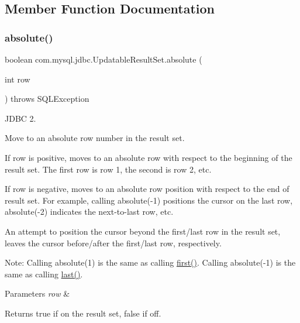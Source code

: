 \subsection{Member Function Documentation}
\mbox{\label{classcom_1_1mysql_1_1jdbc_1_1_updatable_result_set_ae6cbce4543dd7fd0006429895feb1252}} 
\subsubsection{\texorpdfstring{absolute()}{absolute()}}
{\footnotesize\ttfamily boolean com.\+mysql.\+jdbc.\+Updatable\+Result\+Set.\+absolute (\begin{DoxyParamCaption}\item[{int}]{row }\end{DoxyParamCaption}) throws S\+Q\+L\+Exception}

J\+D\+BC 2.

Move to an absolute row number in the result set. 

If row is positive, moves to an absolute row with respect to the beginning of the result set. The first row is row 1, the second is row 2, etc. 

If row is negative, moves to an absolute row position with respect to the end of result set. For example, calling absolute(-\/1) positions the cursor on the last row, absolute(-\/2) indicates the next-\/to-\/last row, etc. 

An attempt to position the cursor beyond the first/last row in the result set, leaves the cursor before/after the first/last row, respectively. 

Note\+: Calling absolute(1) is the same as calling \mbox{\hyperlink{classcom_1_1mysql_1_1jdbc_1_1_updatable_result_set_a190d77a54225de646c3dbe21fc936b16}{first()}}. Calling absolute(-\/1) is the same as calling \mbox{\hyperlink{classcom_1_1mysql_1_1jdbc_1_1_updatable_result_set_ae4132b5cb109e8e6a2179896f09e1254}{last()}}. 


\begin{DoxyParams}{Parameters}
{\em row} & \\
\hline
\end{DoxyParams}
\begin{DoxyReturn}{Returns}
true if on the result set, false if off.
\end{DoxyReturn}

